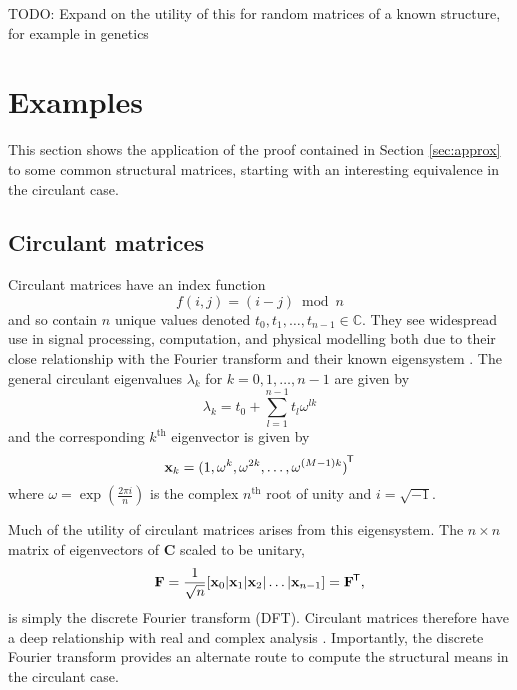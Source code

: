 \documentclass[letterpaper,12pt,oneside,final]{article}
\newcommand{\ve}[1]{\mathbf{#1}}           %
\newcommand{\m}[1]{\mathbf{#1}}               %
\newcommand{\tr}[1]{{#1}^{\mkern-1.5mu\mathsf{T}}}              %
\newcommand{\field}[1]{\mathbb{#1}}
\newcommand{\Complex}{\field{C}}
\newcommand{\TODO}[1]{{\color{brickred} TODO:  {#1}}}
\begin{document}
\TODO{Expand on the utility of this for random matrices of a known structure, for example in genetics \cite{salahub2022structural}}

\section{Examples} \label{sec:examples}

This section shows the application of the proof contained in Section \ref{sec:approx} to some common structural matrices, starting with an interesting equivalence in the circulant case.

\subsection{Circulant matrices}

Circulant matrices have an index function
\begin{equation} \label{eq:circdefn}
  f(i,j) = (i - j) \bmod n
\end{equation}
and so contain $n$ unique values denoted $t_0, t_1, \dots, t_{n-1} \in \Complex$. They see widespread use in signal processing, computation, and physical modelling both due to their close relationship with the Fourier transform and their known eigensystem \cite{chan1988optimal,gray2006toeplitz,narayanshastry2021toeplitz}. The general circulant eigenvalues $\lambda_k$ for $k = 0, 1, \dots, n-1$ are given by
\begin{equation} \label{eq:circevals}
  \lambda_k = t_0 + \sum_{l = 1}^{n-1} t_l \omega^{lk}
\end{equation}
and the corresponding $k^{\text{th}}$ eigenvector is given by
\begin{equation} \label{eq:circevecs}
  \ve{x}_k = \tr{(1, \omega^k, \omega^{2k}, \dots, \omega^{(M-1)k} )}
\end{equation}
where $\omega = \exp (\frac{2 \pi i}{n})$ is the complex $n^{\text{th}}$ root of unity and $i = \sqrt{-1}$.

Much of the utility of circulant matrices arises from this eigensystem. The $n \times n$ matrix of eigenvectors of $\m{C}$ scaled to be unitary,
\begin{equation} \label{eq:DFT}
  \m{F} = \frac{1}{\sqrt{n}} [\ve{x}_0 | \ve{x}_1 | \ve{x}_2 | \dots | \ve{x}_{n-1} ] = \tr{\m{F}},
\end{equation}
is simply the discrete Fourier transform (DFT). Circulant matrices therefore have a deep relationship with real and complex analysis \cite{grenanderszego1958}. Importantly, the discrete Fourier transform provides an alternate route to compute the structural means in the circulant case.
\end{document}
